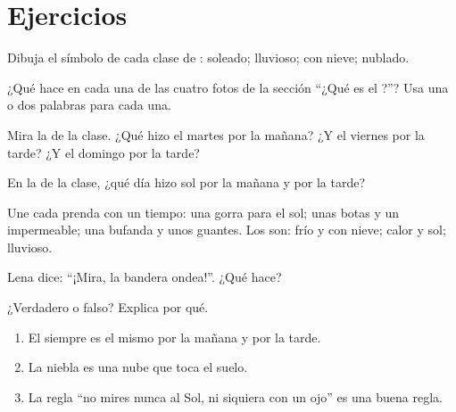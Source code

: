 \section{Ejercicios}

\begin{exercise}[$\star$]\label{exo:g1:watching-the-weather:1}
Dibuja el símbolo de cada clase de : soleado; lluvioso; con nieve;
nublado.
\end{exercise}

\begin{exercise}[$\star$]\label{exo:g1:watching-the-weather:2}
¿Qué  hace en cada una de las cuatro fotos de la sección
``¿Qué es el ?''? Usa una o dos palabras para cada una.
\end{exercise}

\begin{exercise}[$\star$]\label{exo:g1:watching-the-weather:3}
Mira la  de la clase. ¿Qué  hizo el martes por la
mañana? ¿Y el viernes por la tarde? ¿Y el domingo por la tarde?
\end{exercise}

\begin{exercise}[$\star$]\label{exo:g1:watching-the-weather:4}
En la  de la clase, ¿qué día hizo sol por la mañana y por
la tarde?
\end{exercise}

\begin{exercise}[$\star$]\label{exo:g1:watching-the-weather:5}
Une cada prenda con un tiempo: una gorra para el sol; unas botas y un
impermeable; una bufanda y unos guantes. Los  son: frío y con nieve;
calor y sol; lluvioso.
\end{exercise}

\begin{exercise}[$\star$]\label{exo:g1:watching-the-weather:6}
Lena dice: ``¡Mira, la bandera ondea!''. ¿Qué  hace?
\end{exercise}

\begin{exercise}[$\star$]\label{exo:g1:watching-the-weather:7}
¿Verdadero o falso? Explica por qué.
\begin{enumerate}
  \item El  siempre es el mismo por la mañana y por la tarde.
  \item La niebla es una nube que toca el suelo.
  \item La regla ``no mires nunca al Sol, ni siquiera con un ojo'' es una
        buena regla.
\end{enumerate}
\end{exercise}

